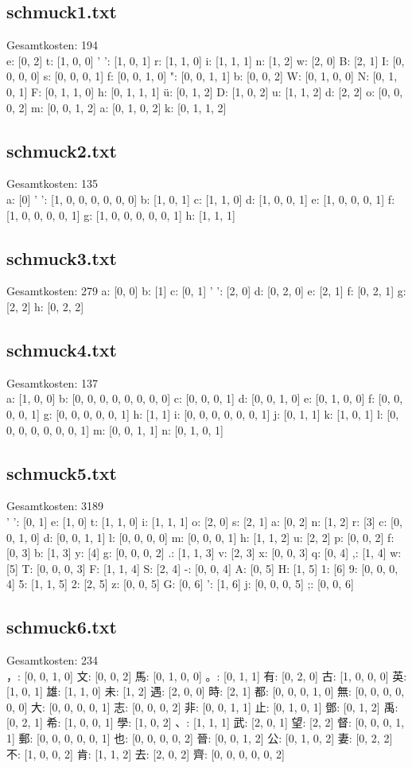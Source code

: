 \documentclass[a4paper,10pt,ngerman]{scrartcl}
\begin{document}
\subsection{schmuck1.txt}
Gesamtkosten: 194\\
e: [0, 2]
t: [1, 0, 0]
' ': [1, 0, 1]
r: [1, 1, 0]
i: [1, 1, 1]
n: [1, 2]
w: [2, 0]
B: [2, 1]
I: [0, 0, 0, 0]
s: [0, 0, 0, 1]
f: [0, 0, 1, 0]
": [0, 0, 1, 1]
b: [0, 0, 2]
W: [0, 1, 0, 0]
N: [0, 1, 0, 1]
F: [0, 1, 1, 0]
h: [0, 1, 1, 1]
ü: [0, 1, 2]
D: [1, 0, 2]
u: [1, 1, 2]
d: [2, 2]
o: [0, 0, 0, 2]
m: [0, 0, 1, 2]
a: [0, 1, 0, 2]
k: [0, 1, 1, 2]
\subsection{schmuck2.txt}
Gesamtkosten: 135\\
a: [0]
' ': [1, 0, 0, 0, 0, 0, 0]
b: [1, 0, 1]
c: [1, 1, 0]
d: [1, 0, 0, 1]
e: [1, 0, 0, 0, 1]
f: [1, 0, 0, 0, 0, 1]
g: [1, 0, 0, 0, 0, 0, 1]
h: [1, 1, 1]
\subsection{schmuck3.txt}
Gesamtkosten: 279
a: [0, 0]
b: [1]
c: [0, 1]
' ': [2, 0]
d: [0, 2, 0]
e: [2, 1]
f: [0, 2, 1]
g: [2, 2]
h: [0, 2, 2]
\subsection{schmuck4.txt}
Gesamtkosten: 137\\
a: [1, 0, 0]
b: [0, 0, 0, 0, 0, 0, 0, 0]
c: [0, 0, 0, 1]
d: [0, 0, 1, 0]
e: [0, 1, 0, 0]
f: [0, 0, 0, 0, 1]
g: [0, 0, 0, 0, 0, 1]
h: [1, 1]
i: [0, 0, 0, 0, 0, 0, 1]
j: [0, 1, 1]
k: [1, 0, 1]
l: [0, 0, 0, 0, 0, 0, 0, 1]
m: [0, 0, 1, 1]
n: [0, 1, 0, 1]
\subsection{schmuck5.txt}
Gesamtkosten: 3189\\
' ': [0, 1]
e: [1, 0]
t: [1, 1, 0]
i: [1, 1, 1]
o: [2, 0]
s: [2, 1]
a: [0, 2]
n: [1, 2]
r: [3]
c: [0, 0, 1, 0]
d: [0, 0, 1, 1]
l: [0, 0, 0, 0]
m: [0, 0, 0, 1]
h: [1, 1, 2]
u: [2, 2]
p: [0, 0, 2]
f: [0, 3]
b: [1, 3]
y: [4]
g: [0, 0, 0, 2]
.: [1, 1, 3]
v: [2, 3]
x: [0, 0, 3]
q: [0, 4]
,: [1, 4]
w: [5]
T: [0, 0, 0, 3]
F: [1, 1, 4]
S: [2, 4]
-: [0, 0, 4]
A: [0, 5]
H: [1, 5]
1: [6]
9: [0, 0, 0, 4]
5: [1, 1, 5]
2: [2, 5]
z: [0, 0, 5]
G: [0, 6]
’: [1, 6]
j: [0, 0, 0, 5]
;: [0, 0, 6]
\subsection{schmuck6.txt}
Gesamtkosten: 234\\
，: [0, 0, 1, 0]
文: [0, 0, 2]
馬: [0, 1, 0, 0]
。: [0, 1, 1]
有: [0, 2, 0]
古: [1, 0, 0, 0]
英: [1, 0, 1]
雄: [1, 1, 0]
未: [1, 2]
遇: [2, 0, 0]
時: [2, 1]
都: [0, 0, 0, 1, 0]
無: [0, 0, 0, 0, 0, 0]
大: [0, 0, 0, 0, 1]
志: [0, 0, 0, 2]
非: [0, 0, 1, 1]
止: [0, 1, 0, 1]
鄧: [0, 1, 2]
禹: [0, 2, 1]
希: [1, 0, 0, 1]
學: [1, 0, 2]
、: [1, 1, 1]
武: [2, 0, 1]
望: [2, 2]
督: [0, 0, 0, 1, 1]
郵: [0, 0, 0, 0, 0, 1]
也: [0, 0, 0, 0, 2]
晉: [0, 0, 1, 2]
公: [0, 1, 0, 2]
妻: [0, 2, 2]
不: [1, 0, 0, 2]
肯: [1, 1, 2]
去: [2, 0, 2]
齊: [0, 0, 0, 0, 0, 2]
\end{document}

